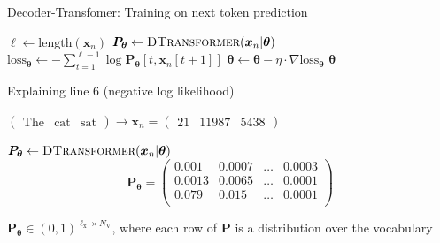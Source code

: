 \documentclass[12pt,aspectratio=169,handout]{beamer}
\begin{document}
\begin{frame}{Decoder-Transfomer: Training on next token prediction}
	
	\vspace{-1em}	
	\begin{minipage}[t][10cm][t]{15cm}
		\begin{algorithmic}[1]
			\State $\ell \gets \text{length}(\bm{x}_n)$
			\State $\bm{P_{\theta}} \gets \textsc{DTransformer}(\bm{x}_n | \bm{\theta})$
			\State $\text{loss}_{\bm{\theta}} \gets - \sum_{t = 1}^{\ell - 1} \log \bm{P_{\theta}} [t, \bm{x}_n[t + 1]] $
			\State $\bm{\theta} \gets \bm{\theta} - \eta \cdot \nabla \text{loss}_{\bm{\theta}}$
			\EndFor
			\EndFor
			\State \Return $\bm{\theta}$
			\EndFunction
		\end{algorithmic}
		
	\end{minipage}
\end{frame}


\begin{frame}{Explaining line 6 (negative log likelihood)}
	
	$
	\begin{pmatrix}
		\text{The} &
		\text{cat} &
		\text{sat}
	\end{pmatrix}
	\rightarrow
	\bm{x}_n =
	\begin{pmatrix}
		21 &
		11987 &
		5438 
	\end{pmatrix}
	$
	
	$\bm{P_{\theta}} \gets \textsc{DTransformer}(\bm{x}_n | \bm{\theta})$
	$$
	\bm{P_{\theta}} =
	\begin{pmatrix}
		0.001 & 0.0007 & \ldots & 0.0003 \\
		0.0013 & 0.0065 & \ldots & 0.0001 \\
		0.079 & 0.015 & \ldots & 0.0001 \\
	\end{pmatrix}
	$$
	
	$\bm{P_{\theta}} \in (0,1)^{\ell_{\text{x}} \times N_{\text{V}}}$, where each row of $\bm{P}$ is a distribution over the vocabulary
	
\end{frame}
\end{document}
